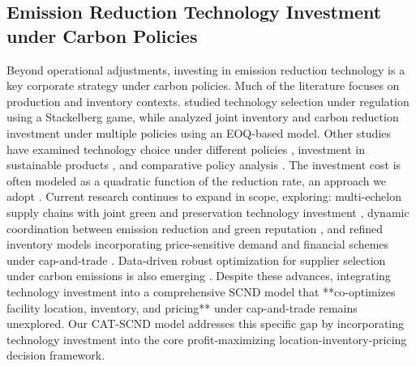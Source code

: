 \documentclass[]{article}
\theoremstyle{plain}%
\theoremstyle{definition}
\theoremstyle{remark}
\theoremstyle{plain}%
\begin{document}
\subsection{Emission Reduction Technology Investment under Carbon Policies}
Beyond operational adjustments, investing in emission reduction technology is a key corporate strategy under carbon policies. Much of the literature focuses on production and inventory contexts. \cite{krass2013environmental} studied technology selection under regulation using a Stackelberg game, while \cite{toptal2014joint} analyzed joint inventory and carbon reduction investment under multiple policies using an EOQ-based model. Other studies have examined technology choice under different policies \cite{drake2016technology}, investment in sustainable products \cite{dong2016sustainability}, and comparative policy analysis \cite{hasan2021optimizing}. The investment cost is often modeled as a quadratic function of the reduction rate, an approach we adopt \cite{dong2016sustainability, liu2023study}.
Current research continues to expand in scope, exploring: multi-echelon supply chains with joint green and preservation technology investment \cite{middya2025three}, dynamic coordination between emission reduction and green reputation \cite{wang2022emission}, and refined inventory models incorporating price-sensitive demand and financial schemes under cap-and-trade \cite{taleizadeh2022sustainable, barman2025carbon}. Data-driven robust optimization for supplier selection under carbon emissions is also emerging \cite{dong2025data}. Despite these advances, integrating technology investment into a comprehensive SCND model that **co-optimizes facility location, inventory, and pricing** under cap-and-trade remains unexplored. Our CAT-SCND model addresses this specific gap by incorporating technology investment into the core profit-maximizing location-inventory-pricing decision framework.
\end{document}
